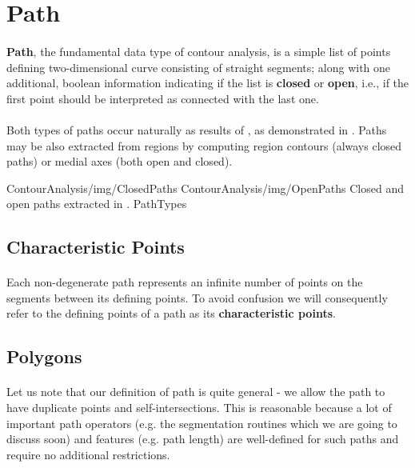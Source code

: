 \section{Path}

\paragraph*{}
\textbf{Path}, the fundamental data type of contour analysis, is a simple list of points defining two-dimensional curve consisting of straight segments; along with one additional, boolean information indicating if the list is \textbf{closed} or \textbf{open}, i.e., if the first point should be interpreted as connected with the last one.

\paragraph*{}
Both types of paths occur naturally as results of , as demonstrated in . Paths may be also extracted from regions by computing region contours (always closed paths) or medial axes (both open and closed).

\twoFigures
{ContourAnalysis/img/ClosedPaths}
{ContourAnalysis/img/OpenPaths}
{Closed and open paths extracted in .}
{PathTypes}
{\basicWidth}

\subsection{Characteristic Points}

\paragraph*{}
Each non-degenerate path represents an infinite number of points on the segments between its defining points. To avoid confusion we will consequently refer to the defining points of a path as its \textbf{characteristic points}.

\subsection{Polygons}

\paragraph*{}
Let us note that our definition of path is quite general - we allow the path to have duplicate points and self-intersections. This is reasonable because a lot of important path operators (e.g. the segmentation routines which we are going to discuss soon) and features (e.g. path length) are well-defined for such paths and require no additional restrictions.

